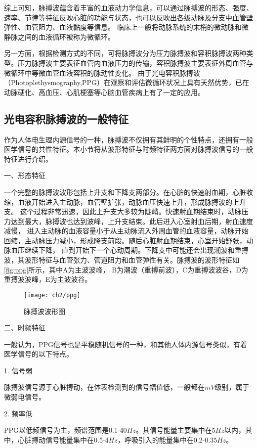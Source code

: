 综上可知，脉搏波蕴含着丰富的血液动力学信息，可以通过脉搏波的形态、强度、速率、节律等特征反映心脏的功能与状态，也可以反映出各级动脉及分支中血管壁弹性、血管阻力、血液黏度等信息。
临床上一般将动脉系统的末梢的微动脉和微静脉之间的血液循环被称为微循环\cite{Abraham2011,John2004}。

另一方面，根据检测方式的不同，可将脉搏波分为压力脉搏波和容积脉搏波两种类型。压力脉搏波主要表征血管内血液压力的传输，容积脉搏波主要表征外周血管与微循环中等微血管血液容积的脉动性变化。
由于光电容积脉搏波（Photoplethysmography,PPG）在观察和评估微循环状况上具有天然优势，已在动脉硬化、高血压、心肌梗塞等心脑血管疾病上有了一定的应用\cite{PPGYY,Allen2007,THOCBPM,Zhang2010}。
\subsection{光电容积脉搏波的一般特征}
作为人体电生理内源信号的一种，脉搏波不仅拥有其鲜明的个性特点，还拥有一般医学信号的共性特征。本小节将从波形特征与时频特征两方面对脉搏波信号的一般特征进行介绍。

一、形态特征

一个完整的脉搏波波形包括上升支和下降支两部分。在心脏的快速射血期，心脏收缩，血液开始进入主动脉，血管壁扩张，动脉血压快速上升，形成脉搏波的上升支。
这个过程非常迅速，因此上升支大多较为陡峭。快速射血期结束时，动脉压力达到最大，脉搏波也达到波峰，上升支结束。此后进入心室射血后期，射血速度减慢，
进入主动脉的血液容量小于从主动脉流入外周血管的血液容量，动脉开始回缩，主动脉压力减小，形成降支前段。随后心脏射血期结束，心室开始舒张，动脉血压继续下降，
直到开始下一个心动周期。下降支中可能还会出现潮波和重搏波，其波形特征与血管张力、管道阻力和血管弹性有关。脉搏波的波形特征如\autoref{fig:ppg}所示，其中A为主波波峰，
B为潮波（重搏前波），C为重搏波波谷，D为重搏波波峰，E为主波波谷。
\begin{figure}[htbp]
\centering
\texttt{[image: ch2/ppg]} 
\caption{\label{fig:ppg}脉搏波波形图}
\end{figure}

二、时频特征

一般认为，PPG信号也是平稳随机信号的一种，和其他人体内源信号类似，有着医学信号的以下特点\cite{Ma2015,Qiu2012,Naraharisetti2011,Miao2020}。

1. 信号弱

脉搏波信号源于心脏搏动，在体表检测到的信号幅值低，一般都在$mV$级别，属于微弱电信号。

2. 频率低

PPG以低频信号为主，频谱范围是0.1-40$Hz$。其信号能量主要集中在5$Hz$以内，其中，心脏搏动信号能量集中在0.5-4$Hz$，呼吸引入的能量集中在0.2-0.35$Hz$。


